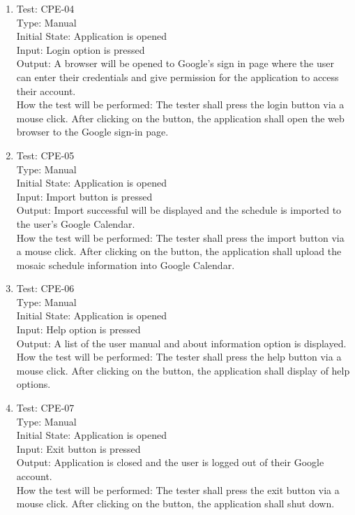 \documentclass[12pt, titlepage]{article}
\begin{document}
\begin{enumerate}
        
    \item Test: CPE-04\\
    
    Type: Manual\\
    Initial State: Application is opened\\
    Input: Login option is pressed\\
    Output: A browser will be opened to Google's sign in page where the user can enter their credentials and give permission for the application to access their account.\\
    How the test will be performed: The tester shall press the login button via a mouse click. After clicking on the button, the application shall open the web browser to the Google sign-in page.\\
    
    \item Test: CPE-05\\
    
    Type: Manual\\
    Initial State: Application is opened\\
    Input: Import button is pressed\\
    Output: Import successful will be displayed and the schedule is imported to the user's Google Calendar.\\
    How the test will be performed: The tester shall press the import button via a mouse click. After clicking on the button, the application shall upload the mosaic schedule information into Google Calendar.\\
    
    \item Test: CPE-06\\
    
    Type: Manual\\
    Initial State: Application is opened\\
    Input: Help option is pressed\\
    Output: A list of the user manual and about information option is displayed.\\
    How the test will be performed: The tester shall press the help button via a mouse click. After clicking on the button, the application shall display of help options.\\
    
     \item Test: CPE-07\\
    
    Type: Manual\\
    Initial State: Application is opened\\
    Input: Exit button is pressed\\
    Output: Application is closed and the user is logged out of their Google account.\\
    How the test will be performed: The tester shall press the exit button via a mouse click. After clicking on the button, the application shall shut down.\\
    
\end{enumerate}
\color{black}
\end{document}
